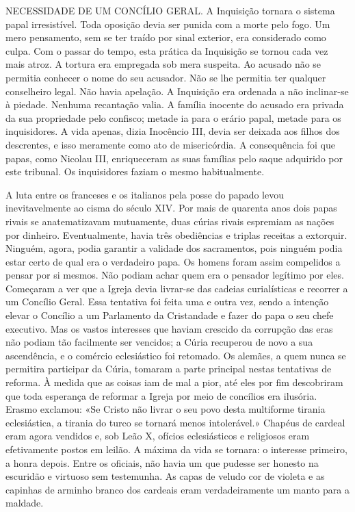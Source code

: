 \documentclass[11pt,a5paper,twoside,openany]{book}
\begin{document}
NECESSIDADE DE UM CONCÍLIO GERAL. A Inquisição tornara o sistema papal irresistível. Toda oposição devia ser punida com a morte pelo fogo. Um mero pensamento, sem se ter traído por sinal exterior, era considerado como culpa. Com o passar do tempo, esta prática da Inquisição se tornou cada vez mais atroz. A tortura era empregada sob mera suspeita. Ao acusado não se permitia conhecer o nome do seu acusador. Não se lhe permitia ter qualquer conselheiro legal. Não havia apelação. A Inquisição era ordenada a não inclinar-se à piedade. Nenhuma recantação valia. A família inocente do acusado era privada da sua propriedade pelo confisco; metade ia para o erário papal, metade para os inquisidores. A vida apenas, dizia Inocêncio III, devia ser deixada aos filhos dos descrentes, e isso meramente como ato de misericórdia. A consequência foi que papas, como Nicolau III, enriqueceram as suas famílias pelo saque adquirido por este tribunal. Os inquisidores faziam o mesmo habitualmente.

A luta entre os franceses e os italianos pela posse do papado levou inevitavelmente ao cisma do século XIV. Por mais de quarenta anos dois papas rivais se anatematizavam mutuamente, duas cúrias rivais espremiam as nações por dinheiro. Eventualmente, havia três obediências e triplas receitas a extorquir. Ninguém, agora, podia garantir a validade dos sacramentos, pois ninguém podia estar certo de qual era o verdadeiro papa. Os homens foram assim compelidos a pensar por si mesmos. Não podiam achar quem era o pensador legítimo por eles. Começaram a ver que a Igreja devia livrar-se das cadeias curialísticas e recorrer a um Concílio Geral. Essa tentativa foi feita uma e outra vez, sendo a intenção elevar o Concílio a um Parlamento da Cristandade e fazer do papa o seu chefe executivo. Mas os vastos interesses que haviam crescido da corrupção das eras não podiam tão facilmente ser vencidos; a Cúria recuperou de novo a sua ascendência, e o comércio eclesiástico foi retomado. Os alemães, a quem nunca se permitira participar da Cúria, tomaram a parte principal nestas tentativas de reforma. À medida que as coisas iam de mal a pior, até eles por fim descobriram que toda esperança de reformar a Igreja por meio de concílios era ilusória. Erasmo exclamou: «Se Cristo não livrar o seu povo desta multiforme tirania eclesiástica, a tirania do turco se tornará menos intolerável.» Chapéus de cardeal eram agora vendidos e, sob Leão X, ofícios eclesiásticos e religiosos eram efetivamente postos em leilão. A máxima da vida se tornara: o interesse primeiro, a honra depois. Entre os oficiais, não havia um que pudesse ser honesto na escuridão e virtuoso sem testemunha. As capas de veludo cor de violeta e as capinhas de arminho branco dos cardeais eram verdadeiramente um manto para a maldade.
\end{document}

